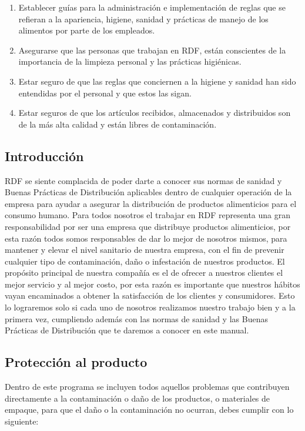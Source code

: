 \begin{enumerate}
	\item Establecer guías para la administración e implementación de reglas que se refieran a la apariencia, higiene, sanidad y prácticas de manejo de los alimentos por parte de los empleados.
	\item Asegurarse que las personas que trabajan en \gls{RDF}, están conscientes de la importancia de la limpieza personal y las prácticas higiénicas.
	\item Estar seguro de que las reglas que conciernen a la higiene y sanidad han sido entendidas por el personal y que estos las sigan.
	\item Estar seguros de que los artículos recibidos, almacenados y distribuidos son de la más alta calidad y están libres de contaminación.
\end{enumerate}

\subsection{Introducción}

\gls{RDF} se siente complacida de poder darte a conocer sus normas de sanidad y Buenas Prácticas de Distribución aplicables dentro de cualquier operación de la empresa para ayudar a asegurar la distribución de productos alimenticios para el consumo humano.
Para todos nosotros el trabajar en \gls{RDF} representa una gran responsabilidad por ser una empresa que distribuye productos alimenticios, por esta razón todos somos responsables de dar lo mejor de nosotros mismos, para mantener y elevar el nivel sanitario de nuestra empresa, con el fin de prevenir cualquier tipo de contaminación, daño o infestación de nuestros productos.
El propósito principal de nuestra compañía es el de ofrecer a nuestros clientes el mejor servicio y al mejor costo, por esta razón es importante que nuestros hábitos vayan encaminados a obtener la satisfacción de los clientes y consumidores.
Esto lo lograremos solo si cada uno de nosotros realizamos nuestro trabajo bien y a la primera vez, cumpliendo además con las normas de sanidad y las Buenas Prácticas de Distribución que te daremos a conocer en este manual.

\subsection{Protección al producto}

Dentro de este programa se incluyen todos aquellos problemas que contribuyen directamente a la contaminación o daño de los productos, o materiales de empaque, para que el daño o la contaminación no ocurran, debes cumplir con lo siguiente:

